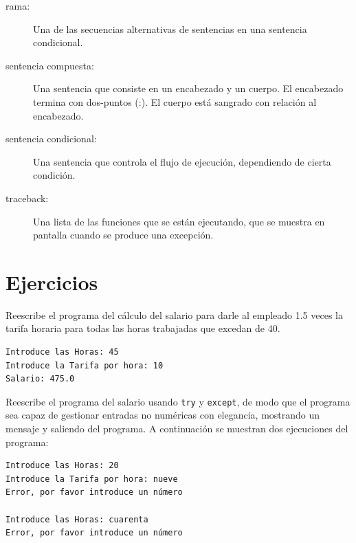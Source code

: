 \begin{description}
\item[rama:] Una de las secuencias alternativas de sentencias en una
sentencia condicional.

\item[sentencia compuesta:]  Una sentencia que consiste en un encabezado
y un cuerpo. El encabezado termina con dos-puntos (:). El cuerpo está sangrado
con relación al encabezado.

\item[sentencia condicional:]  Una sentencia que controla el flujo de
ejecución, dependiendo de cierta condición.

\item[traceback:]  Una lista de las funciones que se están ejecutando,
que se muestra en pantalla cuando se produce una excepción.

\end{description}

\section{Ejercicios}

\begin{ex}
Reescribe el programa del cálculo del salario para darle al empleado 1.5
veces la tarifa horaria para todas
las horas trabajadas que excedan de 40.

\begin{verbatim}
Introduce las Horas: 45
Introduce la Tarifa por hora: 10
Salario: 475.0
\end{verbatim}
\end{ex}

\begin{ex}
Reescribe el programa del salario usando {\tt try} y {\tt except},
de modo que el programa sea capaz de gestionar entradas no numéricas con elegancia,
mostrando un mensaje y saliendo del programa.
A continuación se muestran dos ejecuciones del programa:

\begin{verbatim}
Introduce las Horas: 20
Introduce la Tarifa por hora: nueve
Error, por favor introduce un número

Introduce las Horas: cuarenta
Error, por favor introduce un número
\end{verbatim}
\end{ex}

